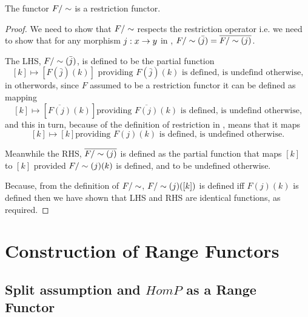 \begin{lemma}
The functor $F/\sim$ is a restriction functor.
\end{lemma}
\begin{proof}
We need to show that  $F/\sim$ respects the restriction operator
i.e. we need to show that for any morphism $j:x \rightarrow y$ in \catcw, $F/\sim(\bar{j})= \overline{F/\sim(j)}$.

The LHS, $F/\sim(\bar{j})$, is defined to  be the partial function
$$ [k] \mapsto [F(\bar{j})(k)] \mbox{ providing $F(\bar{j})(k)$ is defined, is undefind otherwise,}$$
in otherwords, since  $F$ assumed to be a restriction functor it can be defined as mapping
$$ [k] \mapsto [\overline{F(j)}(k)] \mbox{providing $\overline{F(j)}(k)$ is defined, is undefind otherwise,}$$
and this in turn, because of the definition of restriction in \SetP, means that it maps
$$ [k] \mapsto [k] \mbox{providing $F(j)(k)$ is defined, is undefined otherwise.}$$

Meanwhile the RHS, $\overline{F/\sim(j)}$  is defined as the partial function that 
maps $[k]$  to $[k]$  provided  $F/\sim(j)(k)$ is defined, and to be undefined otherwise.

Because,
from the definition of $F/\sim$, $F/\sim(j)([k])$ is defined iff $F(j)(k)$ is defined then
we have shown that LHS and RHS are identical functions, as required.
\end{proof}

\section{Construction of Range Functors}

\subsection{Split assumption and $HomP$ as a Range Functor}

